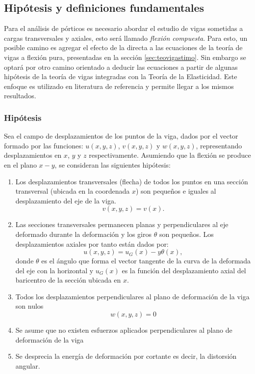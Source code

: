 \subsection{Hipótesis y definiciones fundamentales}

Para el análisis de pórticos es necesario abordar el estudio de vigas sometidas a cargas transversales y axiales, esto será llamado \textit{flexión compuesta}. %
%
Para esto, un posible camino es agregar el efecto de la directa a las ecuaciones de la teoría de vigas a flexión pura, presentadas en la sección \ref{sec:teovigastimo}. %
%
Sin embargo se optará por otro camino orientado a deducir las ecuaciones a partir de algunas hipótesis de la teoría de vigas integradas con la Teoría de la Elasticidad. %
%
Este enfoque es utilizado en literatura de referencia \citep{Wunderlich2002,Onate2013} y permite llegar a los mismos resultados.

\subsubsection{Hipótesis}
Sea el campo de desplazamientos de los puntos de la viga, dados por el vector formado por las funciones: $u(x,y,z)$, $v(x,y,z)$ y $w(x,y,z)$, representando desplazamientos en $x$, $y$ y $z$ respectivamente. %
%
Asumiendo que la flexión se produce en el plano $x-y$, se consideran las siguientes hipótesis:
%
\begin{enumerate}
	\item Los desplazamientos transversales (flecha) de todos los puntos en una sección transversal (ubicada en la coordenada $x$)  son pequeños e iguales al desplazamiento del eje de la viga.
	$$
	v(x,y,z) =  v(x).
	$$
	\item Las secciones transversales permanecen planas y perpendiculares al eje deformado durante la deformación y los giros $\theta$ son pequeños. %
	Los desplazamientos axiales por tanto están dados por:
	\begin{equation} \label{eqn:despaxi}
	u(x,y,z) = u_G(x) - y \theta(x),
	\end{equation}
	donde $\theta$ es el ángulo que forma el vector tangente de la curva de la deformada del eje con la horizontal y $u_G(x)$ es la función del desplazamiento axial del baricentro de la sección ubicada en $x$. 
	\item Todos los desplazamientos perpendiculares al plano de deformación de la viga son nulos
$$
w(x,y,z) = 0
$$
	\item Se asume que no existen esfuerzos aplicados perpendiculares al plano de deformación de la viga
	\item Se desprecia la energía de deformación por cortante es decir, la distorsión angular.
\end{enumerate}

